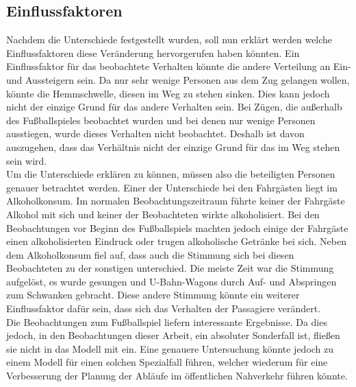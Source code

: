 \subsection{Einflussfaktoren}
Nachdem die Unterschiede festgestellt wurden, soll nun erklärt werden welche Einflussfaktoren diese Veränderung hervorgerufen haben könnten.
Ein Einflussfaktor für das beobachtete Verhalten könnte die andere Verteilung an Ein- und Aussteigern sein. Da nur sehr wenige Personen aus dem Zug gelangen wollen, könnte die Hemmschwelle, diesen im Weg zu stehen sinken. Dies kann jedoch nicht der einzige Grund für das andere Verhalten sein. Bei Zügen, die außerhalb des Fußballspieles beobachtet wurden und bei denen nur wenige Personen ausstiegen, wurde dieses Verhalten nicht beobachtet. Deshalb ist davon auszugehen, dass das Verhältnis nicht der einzige Grund für das im Weg stehen sein wird.\\
Um die Unterschiede erklären zu können, müssen also die beteiligten Personen genauer betrachtet werden. Einer der Unterschiede bei den Fahrgästen liegt im Alkoholkonsum. Im normalen Beobachtungszeitraum führte keiner der Fahrgäste Alkohol mit sich und keiner der Beobachteten wirkte alkoholisiert. Bei den Beobachtungen vor Beginn des Fußballspiels machten jedoch einige der Fahrgäste einen alkoholisierten Eindruck oder trugen alkoholische Getränke bei sich. Neben dem Alkoholkonsum fiel auf, dass auch die Stimmung sich bei diesen Beobachteten zu der sonstigen unterschied. Die meiste Zeit war die Stimmung aufgelöst, es wurde gesungen und U-Bahn-Wagons durch Auf- und Abspringen zum Schwanken gebracht. Diese andere Stimmung könnte ein weiterer Einflussfaktor dafür sein, dass sich das Verhalten der Passagiere verändert. \\
Die Beobachtungen zum Fußballspiel liefern interessante Ergebnisse. Da dies jedoch, in den Beobachtungen dieser Arbeit, ein absoluter Sonderfall ist, fließen sie nicht in das Modell mit ein. Eine genauere Untersuchung könnte jedoch zu einem Modell für einen solchen Spezialfall führen, welcher wiederum für eine Verbesserung der Planung der Abläufe im öffentlichen Nahverkehr führen könnte.